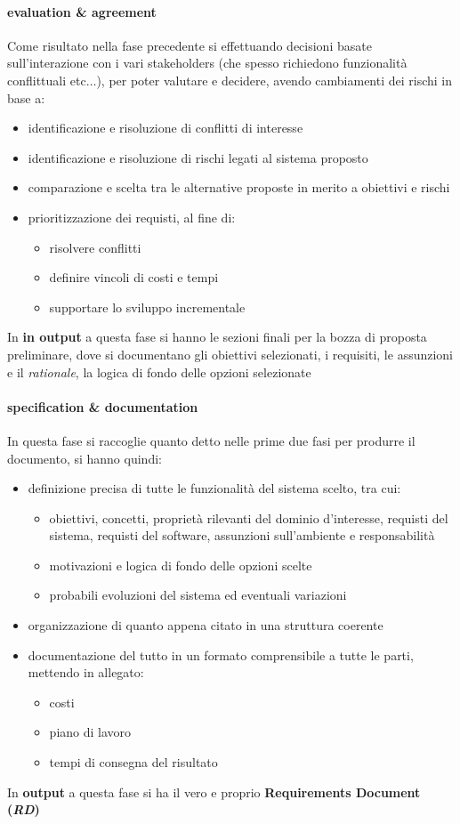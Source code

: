 \documentclass[a4paper,12pt, oneside]{book}
\begin{document}
\paragraph{evaluation \& agreement}
Come risultato nella fase precedente si effettuando decisioni basate
sull'interazione con i vari stakeholders (che spesso richiedono funzionalità
conflittuali etc$\ldots$), per poter valutare e decidere, avendo cambiamenti
dei rischi in base a:
\begin{itemize}
  \item identificazione e risoluzione di conflitti di interesse
  \item identificazione e risoluzione di rischi legati al sistema proposto
  \item comparazione e scelta tra le alternative proposte in merito a obiettivi
  e rischi
  \item prioritizzazione dei requisti, al fine di:
  \begin{itemize}
    \item risolvere conflitti
    \item definire vincoli di costi e tempi
    \item supportare lo sviluppo incrementale
  \end{itemize}
\end{itemize}
In \textbf{in output} a questa fase si hanno le sezioni finali per la bozza di
proposta preliminare, dove si documentano gli obiettivi selezionati, i
requisiti, le assunzioni e il \textit{rationale}, la logica di fondo delle
opzioni selezionate 
\paragraph{specification \& documentation}
In questa fase si raccoglie quanto detto nelle prime due fasi per produrre il
documento, si hanno quindi:
\begin{itemize}
  \item definizione precisa di tutte le funzionalità del sistema scelto, tra
  cui: 
  \begin{itemize}
    \item obiettivi, concetti, proprietà rilevanti del dominio d'interesse,
    requisti del sistema, requisti del software, assunzioni sull'ambiente e
    responsabilità
    \item motivazioni e logica di fondo delle opzioni scelte
    \item probabili evoluzioni del sistema ed eventuali variazioni
  \end{itemize}
  \item organizzazione di quanto appena citato in una struttura coerente
  \item documentazione del tutto in un formato comprensibile a tutte le parti,
  mettendo in allegato:
  \begin{itemize}
    \item costi
    \item piano di lavoro
    \item tempi di consegna del risultato
  \end{itemize}
\end{itemize}
In \textbf{output} a questa fase si ha il vero e proprio \textbf{Requirements
  Document (\textit{RD})}
\end{document}
